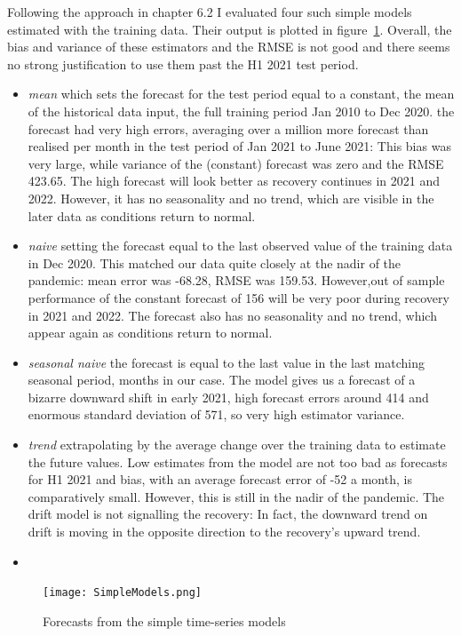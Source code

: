 \documentclass[9pt,technote]{IEEEtran}
\begin{document}
Following the approach in \cite{fpp2} chapter 6.2 I evaluated four such simple models estimated with the training data.  Their output is plotted in figure~\ref{fig:SimpleModels}. Overall, the bias and variance of these estimators and the RMSE is not good and there seems no strong justification to use them past the H1 2021 test period.  
\begin{itemize}
\item
\textit{mean} which sets the forecast for the test period equal to a constant, the mean of the historical data input, the full training period Jan 2010 to Dec 2020.   the forecast had very high errors, averaging over a million more forecast than realised per month in the test period of Jan 2021 to June 2021: This bias was very large, while variance of the (constant) forecast was zero and the RMSE 423.65.  The high forecast will look better as recovery continues in 2021 and 2022.  However, it has no seasonality and no trend, which are visible in the later data as conditions return to normal.  
\item
\textit{naive} setting the forecast equal to the last observed value of the training data in Dec 2020.  This matched our data quite closely at the nadir of the pandemic: mean error was -68.28, RMSE was 159.53.  However,out of sample performance of the constant forecast of 156 will be very poor during recovery in 2021 and 2022.  The forecast also has no seasonality and no trend, which appear again as conditions return to normal.    
\item
\textit{seasonal naive} the forecast is equal to the last value in the last matching seasonal period, months in our case.  The model gives us a forecast of a bizarre downward shift in early 2021, high forecast errors around 414 and enormous standard deviation of 571, so very high estimator variance. 
\item
\textit{trend} extrapolating by the average change over the training data to estimate the future values. Low estimates from the model are not too bad as forecasts for H1 2021 and bias, with an average forecast error of -52 a month, is comparatively small.  However, this is still in the nadir of the pandemic.  The drift model is not signalling the recovery: In fact, the downward trend on drift is moving in the opposite direction to the recovery's upward trend.
\item
\end{itemize}

\begin{figure}[htbp]
\centerline{\texttt{[image: SimpleModels.png]}}
\caption{Forecasts from the simple time-series models}
\label{fig:SimpleModels}
\end{figure}
\end{document}
